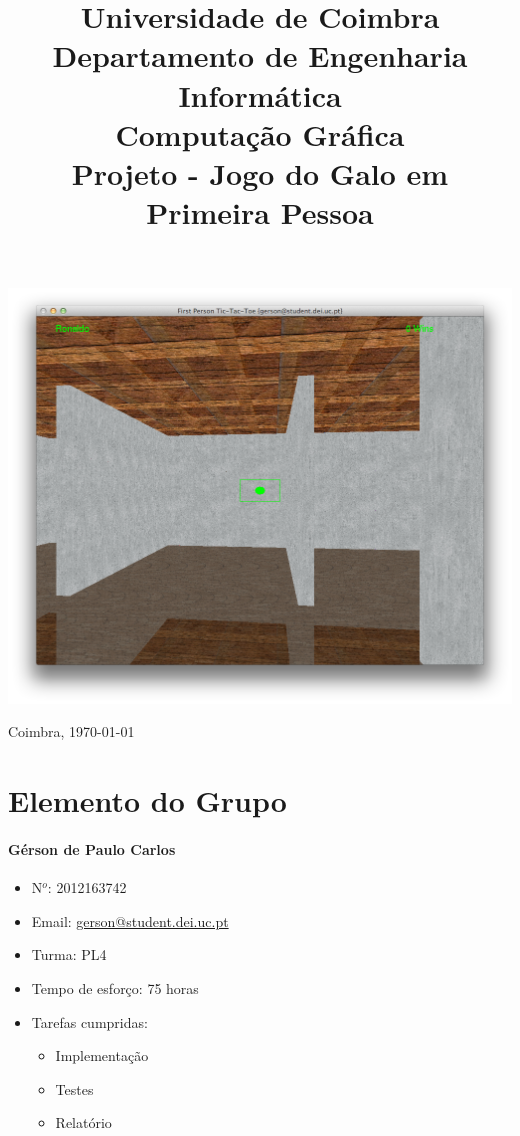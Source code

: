 \documentclass[12pt, onecolumn]{article}
\title{Universidade de Coimbra \\
Departamento de Engenharia Inform\'atica\\
Computa\c{c}\~ao Gr\'afica\\
Projeto - Jogo do Galo em Primeira Pessoa}
\date{}
\begin{document}
\clearpage\maketitle
\thispagestyle{empty}
\includegraphics[scale=0.5]{game.png}
\vfill
\begin{center}
  {\Large Coimbra, \today}
\end{center}

\newpage\tableofcontents

\twocolumn

\section{Elemento do Grupo}

\paragraph{G\'erson de Paulo Carlos} 
\begin{itemize}
  \item{N$^{o}$:} 2012163742 
  \item{Email:} \href{mailto:gerson@student.dei.uc.pt}{gerson@student.dei.uc.pt}
  \item{Turma:} PL4
  \item{Tempo de esfor\c{c}o:} 75 horas
  \item{Tarefas cumpridas:}
  \begin{itemize}
    \item Implementa\c{c}\~ao
    \item Testes
    \item Relat\'orio
  \end{itemize}
\end{itemize}
\end{document}
